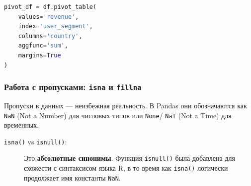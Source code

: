\documentclass[12pt]{article}
\begin{document}
\begin{lstlisting}[language=Python, caption={Построение сводной таблицы}]
pivot_df = df.pivot_table(
    values='revenue',
    index='user_segment',
    columns='country',
    aggfunc='sum',
    margins=True
)
\end{lstlisting}

\subsubsection{Работа с пропусками: \texttt{isna} и \texttt{fillna}}

Пропуски в данных --- неизбежная реальность. В Pandas они обозначаются как \texttt{NaN} (Not a Number) для числовых типов или \texttt{None}/ \texttt{NaT} (Not a Time) для временных.

\begin{description}
    \item[\texttt{isna()} vs \texttt{isnull()}:] Это \textbf{абсолютные синонимы}. Функция \texttt{isnull()} была добавлена для схожести с синтаксисом языка R, в то время как \texttt{isna()} логически продолжает имя константы \texttt{NaN}.
\end{description}
\end{document}
